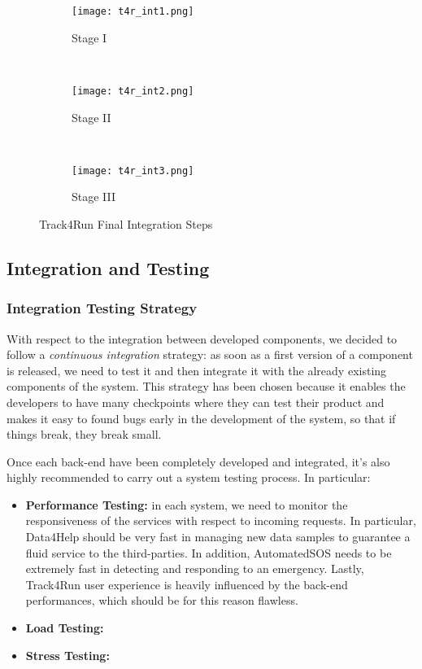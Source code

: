 \FloatBarrier
\begin{figure*}[ht!]	
	\centering	
	\begin{subfigure}[t]{0.3\textwidth}	
		\centering	
		\texttt{[image: t4r\_int1.png]}	
		\caption{Stage I}	
	\end{subfigure}%
	~ \vspace{20px}	
	\begin{subfigure}[t]{0.3\textwidth}	
		\centering	
		\texttt{[image: t4r\_int2.png]}	
		\caption{Stage II}	
	\end{subfigure}
	~ \vspace{20px}
	\begin{subfigure}[t]{0.3\textwidth}	
		\centering	
		\texttt{[image: t4r\_int3.png]}	
		\caption{Stage III}	
	\end{subfigure}	
	
	\caption{Track4Run Final Integration Steps}	
\end{figure*}	
\FloatBarrier

\subsection{Integration and Testing}
\subsubsection{Integration Testing Strategy}
With respect to the integration between developed components, we decided to follow a \textit{continuous integration} strategy: as soon as a first version of a component is released, we need to test it and then integrate it with the already existing components of the system. This strategy has been chosen because it enables the developers to have many checkpoints where they can test their product and makes it easy to found bugs early in the development of the system, so that if things break, they break small.

 
Once each back-end have been completely developed and integrated, it's also highly recommended to carry out a system testing process. In particular:

\begin{itemize}
    \item \textbf{Performance Testing:} in each system, we need to monitor the responsiveness of the services with respect to incoming requests. In particular, Data4Help should be very fast in managing new data samples to guarantee a fluid service to the third-parties. In addition, AutomatedSOS needs to be extremely fast in detecting and responding to an emergency. Lastly, Track4Run user experience is heavily influenced by the back-end performances, which should be for this reason flawless.
    \item \textbf{Load Testing:} 
    \item \textbf{Stress Testing:}
\end{itemize}

